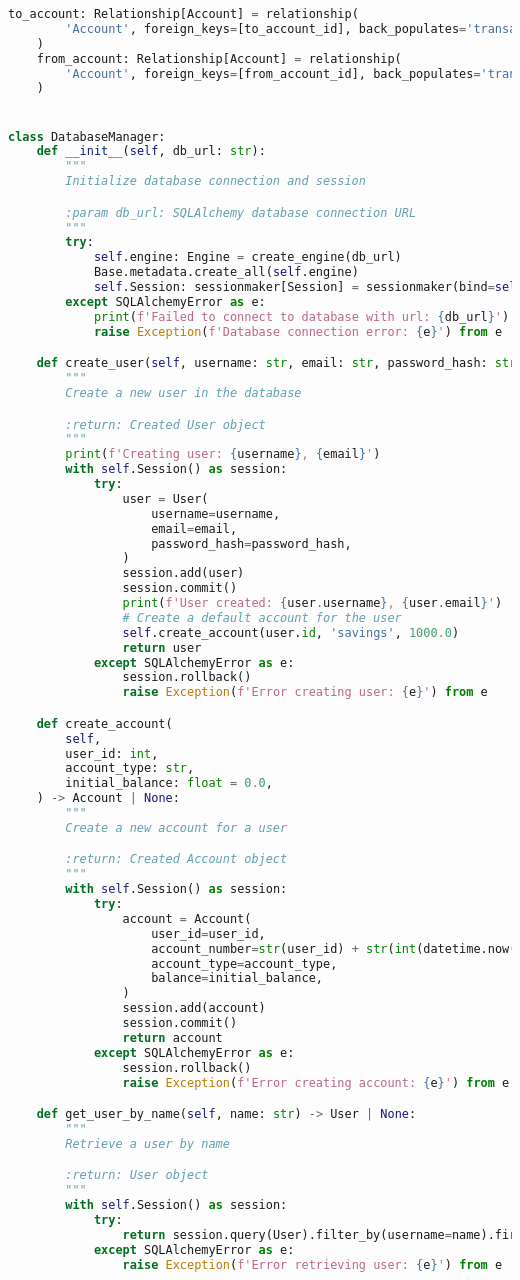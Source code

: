 \begin{lstlisting}[language=Python]
	to_account: Relationship[Account] = relationship(
		'Account', foreign_keys=[to_account_id], back_populates='transactions'
	)
	from_account: Relationship[Account] = relationship(
		'Account', foreign_keys=[from_account_id], back_populates='transactions_from'
	)


class DatabaseManager:
	def __init__(self, db_url: str):
		"""
		Initialize database connection and session

		:param db_url: SQLAlchemy database connection URL
		"""
		try:
			self.engine: Engine = create_engine(db_url)
			Base.metadata.create_all(self.engine)
			self.Session: sessionmaker[Session] = sessionmaker(bind=self.engine)
		except SQLAlchemyError as e:
			print(f'Failed to connect to database with url: {db_url}')
			raise Exception(f'Database connection error: {e}') from e

	def create_user(self, username: str, email: str, password_hash: str) -> User | None:
		"""
		Create a new user in the database

		:return: Created User object
		"""
		print(f'Creating user: {username}, {email}')
		with self.Session() as session:
			try:
				user = User(
					username=username,
					email=email,
					password_hash=password_hash,
				)
				session.add(user)
				session.commit()
				print(f'User created: {user.username}, {user.email}')
				# Create a default account for the user
				self.create_account(user.id, 'savings', 1000.0)
				return user
			except SQLAlchemyError as e:
				session.rollback()
				raise Exception(f'Error creating user: {e}') from e

	def create_account(
		self,
		user_id: int,
		account_type: str,
		initial_balance: float = 0.0,
	) -> Account | None:
		"""
		Create a new account for a user

		:return: Created Account object
		"""
		with self.Session() as session:
			try:
				account = Account(
					user_id=user_id,
					account_number=str(user_id) + str(int(datetime.now().timestamp())),
					account_type=account_type,
					balance=initial_balance,
				)
				session.add(account)
				session.commit()
				return account
			except SQLAlchemyError as e:
				session.rollback()
				raise Exception(f'Error creating account: {e}') from e

	def get_user_by_name(self, name: str) -> User | None:
		"""
		Retrieve a user by name

		:return: User object
		"""
		with self.Session() as session:
			try:
				return session.query(User).filter_by(username=name).first()
			except SQLAlchemyError as e:
				raise Exception(f'Error retrieving user: {e}') from e


\end{lstlisting}
